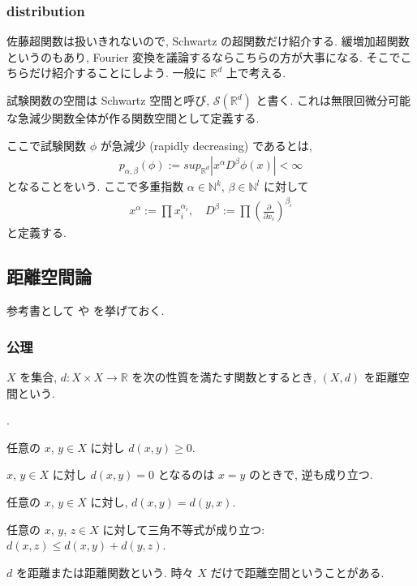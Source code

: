 \documentclass[openany, a4paper, oneside]{book}
\newcounter{enum2}
\renewenvironment{enumerate}{%
\begin{list}%
{%
\arabic{enum2}.\ \,%
}%
{%
\usecounter{enum2}
\setlength{\itemindent}{0pt}%
\setlength{\leftmargin}{6pt}%
\setlength{\rightmargin}{0pt}%
\setlength{\labelsep}{0pt}%
\setlength{\labelwidth}{6pt}%
\setlength{\itemsep}{0pt}%
\setlength{\parsep}{0pt}%
\setlength{\listparindent}{0pt}%
}
}{%
\end{list}%
}
\theoremstyle{break}
\theoremstyle{breakdefn}
\begin{document}
\subsubsection{distribution}
\label{sec-11-3-17-3-2}

佐藤超関数は扱いきれないので, Schwartz の超関数だけ紹介する.
緩増加超関数というのもあり, Fourier 変換を議論するならこちらの方が大事になる.
そこでこちらだけ紹介することにしよう.
一般に $\mathbb{R}^d$ 上で考える.

試験関数の空間は Schwartz 空間と呼び, $\mathcal{S} (\mathbb{R}^d)$ と書く.
これは無限回微分可能な急減少関数全体が作る関数空間として定義する.

ここで試験関数 $\phi$ が急減少 (rapidly decreasing) であるとは,
\begin{align}
 p_{\alpha, \beta} (\phi)
 :=
 sup_{\mathbb{R}^d} \left| x^{\alpha} D^{\beta} \phi (x) \right|
 < \infty
\end{align}
となることをいう.
ここで多重指数 $\alpha \in \mathbb{N}^k$, $\beta \in \mathbb{N}^l$ に対して
\begin{align}
 x^{\alpha}
 :=
 \prod x_i^{\alpha_i}, \quad
 D^{\beta}
 :=
 \prod \left ( \frac{\partial}{\partial x_i} \right)^{\beta_i}
\end{align}
と定義する.
\subsection{距離空間論}
\label{sec-11-3-17-4}

参考書として \cite{ShigeoIchiraku1} や \cite{KazuoMatsuzaka1} を挙げておく.
\subsubsection{公理}
\label{sec-11-3-17-4-1}

$X$ を集合, $d \colon X \times X \to \mathbb{R}$ を次の性質を満たす関数とするとき, $(X, d)$ を距離空間という.
\begin{enumerate}
\item 任意の $x$, $y \in X$ に対し $d (x, y) \geq 0$.
\item $x$, $y \in X$ に対し $d (x, y) = 0$ となるのは $x=y$ のときで, 逆も成り立つ.
\item 任意の $x$, $y \in X$ に対し, $d (x,y) = d (y,x)$.
\item 任意の $x$, $y$, $z \in X$ に対して三角不等式が成り立つ: $d (x,z) \leq d (x,y) + d (y,z)$.
\end{enumerate}
$d$ を距離または距離関数という.
時々 $X$ だけで距離空間ということがある.
\end{document}
